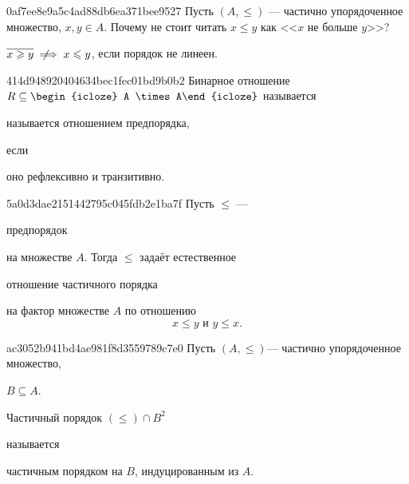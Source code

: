 \begin{note}{0af7ee8e9a5c4ad88db6ea371bee9527}
    Пусть \({ (A, \leqslant) }\) --- частично упорядоченное множество, \({ x, y \in A }\).
    Почему не стоит читать \({ x \leqslant y }\) как <<\({ x }\) не больше \({ y }\)>>?

    \begin{cloze}{1}
        \({ \overline{x \geqslant y} \:\:\not\!\!\!\implies x \leqslant y }\), если порядок не линеен.
    \end{cloze}
\end{note}

\begin{note}{414d948920404634bec1fec01bd9b0b2}
    Бинарное отношение \({ R \subseteq \begin{icloze}{3}A \times A\end{icloze} }\) называется \begin{icloze}{2}называется отношением предпорядка,\end{icloze} если \begin{icloze}{1}оно рефлексивно и транзитивно.\end{icloze}
\end{note}

\begin{note}{5a0d3dae2151442795c045fdb2e1ba7f}
    Пусть \({ \leqslant }\) --- \begin{icloze}{3}предпорядок\end{icloze} на множестве \({ A }\).
    Тогда \({ \leqslant }\) задаёт естественное \begin{icloze}{2}отношение частичного порядка\end{icloze}
    \begin{icloze}{1}
        на фактор множестве \({ A }\) по отношению
        \[
            x \leqslant y \text{ и } y \leqslant x.
        \]
    \end{icloze}
\end{note}

\begin{note}{ac3052b941bd4ae981f8d3559789c7e0}
    Пусть \({ (A, \leqslant) }\)--- частично упорядоченное множество, \begin{icloze}{3}\({ B \subseteq A }\).\end{icloze}
    \begin{icloze}{2}Частичный порядок \({ (\leqslant) \cap B^2 }\)\end{icloze} называется \begin{icloze}{1}частичным порядком на \({ B }\), индуцированным из \({ A }\).\end{icloze}
\end{note}


